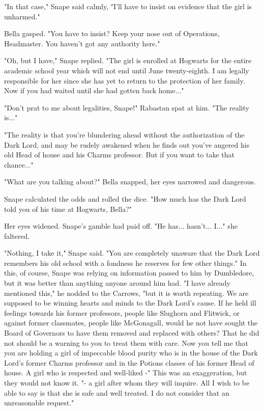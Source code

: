 "In that case," Snape said calmly, "I'll have to insist on evidence that the girl is unharmed."

Bella gasped. "You have to insist? Keep your nose out of Operations, Headmaster. You haven't got any authority here."

"Oh, but I have," Snape replied. "The girl is enrolled at Hogwarts for the entire academic school year which will not end until June twenty-eighth. I am legally responsible for her since she has yet to return to the protection of her family. Now if you had waited until she had gotten back home..."

"Don't prat to me about legalities, Snape!" Rabastan spat at him. "The reality is..."

"The reality is that you're blundering ahead without the authorization of the Dark Lord, and may be rudely awakened when he finds out you've angered his old Head of house and his Charms professor. But if you want to take that chance..."

"What are you talking about?" Bella snapped, her eyes narrowed and dangerous.

Snape calculated the odds and rolled the dice. "How much has the Dark Lord told you of his time at Hogwarts, Bella?"

Her eyes widened. Snape's gamble had paid off. "He has... hasn't... I..." she faltered.

"Nothing, I take it," Snape said. "You are completely unaware that the Dark Lord remembers his old school with a fondness he reserves for few other things." In this, of course, Snape was relying on information passed to him by Dumbledore, but it was better than anything anyone around him had. "I have already mentioned this," he nodded to the Carrows, "but it is worth repeating. We are supposed to be winning hearts and minds to the Dark Lord's cause. If he held ill feelings towards his former professors, people like Slughorn and Flitwick, or against former classmates, people like McGonagall, would he not have sought the Board of Governors to have them removed and replaced with others? That he did not should be a warning to you to treat them with care. Now you tell me that you are holding a girl of impeccable blood purity who is in the house of the Dark Lord's former Charms professor and in the Potions classes of his former Head of house. A girl who is respected and well-liked -" This was an exaggeration, but they would not know it. "- a girl after whom they will inquire. All I wish to be able to say is that she is safe and well treated. I do not consider that an unreasonable request."

